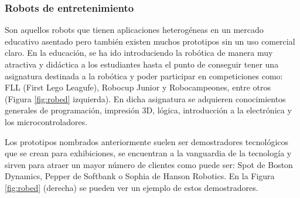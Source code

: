 \subsubsection{Robots de entretenimiento}

Son aquellos robots que tienen aplicaciones heterogéneas en un mercado educativo asentado pero también existen muchos prototipos sin un uso comercial claro. En la educación, se ha ido introduciendo la robótica de manera muy atractiva y didáctica a los estudiantes hasta el punto de conseguir tener una asignatura destinada a la robótica y poder participar en competiciones como: FLL (First Lego Leagufe), Robocup Junior y Robocampeones, entre otros (Figura \ref{fig:robed} izquierda).  En dicha asignatura se adquieren conocimientos generales de programación, impresión 3D, lógica, introducción a la electrónica y los microcontroladores.

Los prototipos nombrados anteriormente suelen ser demostradores tecnológicos que se crean para exhibiciones, se encuentran a la vanguardia de la tecnología y sirven para atraer un mayor número de clientes como puede ser: Spot de Boston Dynamics, Pepper de Softbank o Sophia de Hanson Robotics. En la Figura \ref{fig:robed} (derecha) se pueden ver un ejemplo de estos demostradores.\\


